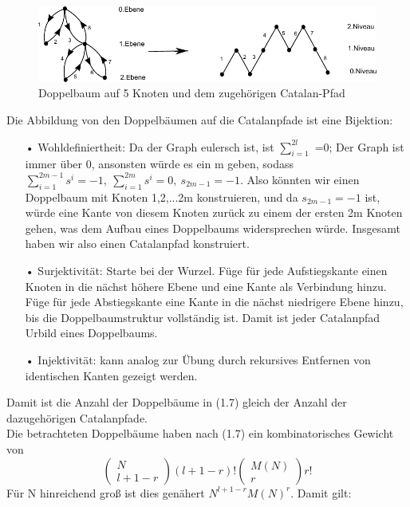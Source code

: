 \documentclass[a4paper, 11pt]{scrreprt}
\begin{document}
\begin{figure}[htpb]
	\centering
	\includegraphics[width=1.00\textwidth]{Catalan-Pfad.pdf}
	\caption{Doppelbaum auf 5 Knoten und dem zugehörigen Catalan-Pfad} 
\end{figure}

Die Abbildung von den Doppelbäumen auf die Catalanpfade ist eine Bijektion:
\begin{itemize}
 \item[•]Wohldefiniertheit: Da der Graph eulersch ist, ist $ \sum_{i=1}^{2l} $ =0; Der Graph ist immer über 0, ansonsten würde es ein m geben, sodass $ \sum_{i=1}^{2m-1}s^{i}=-1, ~\sum_{i=1}^{2m}s^{i}=0, ~ s_{2m-1}=-1  $. Also könnten wir einen Doppelbaum mit Knoten {1,2,...2m} konstruieren, und da $ s_{2m-1}=-1  $ ist, würde eine Kante von diesem Knoten zurück zu einem der ersten 2m Knoten gehen, was dem Aufbau eines Doppelbaums widersprechen würde. Insgesamt haben wir also einen Catalanpfad konstruiert. 
 \item[•] Surjektivität: Starte bei der Wurzel. Füge für jede Aufstiegskante einen Knoten in die nächst höhere Ebene und eine Kante als Verbindung hinzu. Füge für jede Abstiegskante eine Kante in die nächst niedrigere Ebene hinzu, bis die Doppelbaumstruktur vollständig ist. Damit ist jeder Catalanpfad Urbild eines Doppelbaums. 
\item[•] Injektivität: kann analog zur Übung durch rekursives Entfernen von identischen Kanten gezeigt werden.\\
\end{itemize}
Damit ist die Anzahl der Doppelbäume in (1.7) gleich der Anzahl der dazugehörigen Catalanpfade.\\
Die betrachteten Doppelbäume haben nach (1.7) ein kombinatorisches Gewicht von 
	\begin{equation}
		\begin{pmatrix} N\\ l+1-r\end{pmatrix} (l+1-r)! \begin{pmatrix} M(N)\\r\end{pmatrix} r!
	\end{equation}
Für N hinreichend groß ist dies genähert \(N^{l+1-r}M(N)^r\). Damit gilt:
\end{document}
